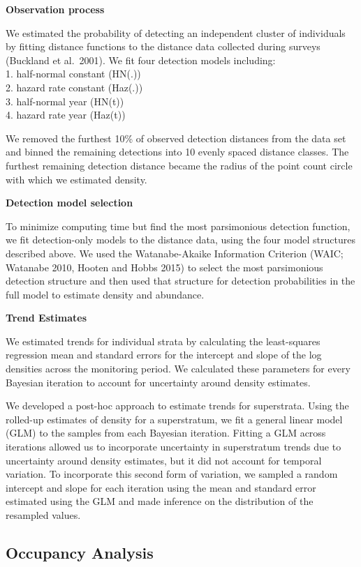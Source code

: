\documentclass[
  letterpaper,
  DIV=11,
  numbers=noendperiod,
  oneside]{scrreprt}
\begin{document}
\textbf{Observation process}

We estimated the probability of detecting an independent cluster of
individuals by fitting distance functions to the distance data collected
during surveys (Buckland et al.~2001). We fit four detection models
including:\\
1. half-normal constant (HN(.))\\
2. hazard rate constant (Haz(.))\\
3. half-normal year (HN(t))\\
4. hazard rate year (Haz(t))

We removed the furthest 10\% of observed detection distances from the
data set and binned the remaining detections into 10 evenly spaced
distance classes. The furthest remaining detection distance became the
radius of the point count circle with which we estimated density.

\textbf{Detection model selection}

To minimize computing time but find the most parsimonious detection
function, we fit detection-only models to the distance data, using the
four model structures described above. We used the Watanabe-Akaike
Information Criterion (WAIC; Watanabe 2010, Hooten and Hobbs 2015) to
select the most parsimonious detection structure and then used that
structure for detection probabilities in the full model to estimate
density and abundance.

\textbf{Trend Estimates}

We estimated trends for individual strata by calculating the
least-squares regression mean and standard errors for the intercept and
slope of the log densities across the monitoring period. We calculated
these parameters for every Bayesian iteration to account for uncertainty
around density estimates.

We developed a post-hoc approach to estimate trends for superstrata.
Using the rolled-up estimates of density for a superstratum, we fit a
general linear model (GLM) to the samples from each Bayesian iteration.
Fitting a GLM across iterations allowed us to incorporate uncertainty in
superstratum trends due to uncertainty around density estimates, but it
did not account for temporal variation. To incorporate this second form
of variation, we sampled a random intercept and slope for each iteration
using the mean and standard error estimated using the GLM and made
inference on the distribution of the resampled values.

\hypertarget{occupancy-analysis}{%
\subsection{Occupancy Analysis}\label{occupancy-analysis}}
\end{document}
